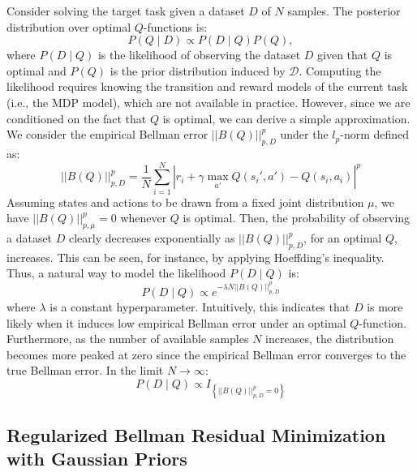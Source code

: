 \documentclass{article}
\begin{document}
Consider solving the target task given a dataset $D$ of $N$ samples. The posterior distribution over optimal $Q$-functions is:
\begin{equation}
P(Q \mid D) \propto P(D \mid Q)P(Q),
\end{equation}
where $P(D \mid Q)$ is the likelihood of observing the dataset $D$ given that $Q$ is optimal and $P(Q)$ is the prior distribution induced by $\mathcal{D}$. Computing the likelihood requires knowing the transition and reward models of the current task (i.e., the MDP model), which are not available in practice. However, since we are conditioned on the fact that $Q$ is optimal, we can derive a simple approximation. We consider the empirical Bellman error $||B(Q)||_{p,D}^p$ under the $l_p$-norm defined as:
\begin{equation}
||B(Q)||_{p,D}^p = \frac{1}{N}\sum_{i=1}^N \left\lvert r_i + \gamma\max_{a'}Q(s_i',a') - Q(s_i,a_i) \right\rvert^p
\end{equation}
Assuming states and actions to be drawn from a fixed joint distribution $\mu$, we have $||B(Q)||_{p,\mu}^p = 0$ whenever $Q$ is optimal. Then, the probability of observing a dataset $D$ clearly decreases exponentially as $||B(Q)||_{p,D}^p$, for  an optimal $Q$, increases. This can be seen, for instance, by applying Hoeffding's inequality. Thus, a natural way to model the likelihood $P(D \mid Q)$ is:
\begin{equation}
P(D \mid Q) \propto e^{-\lambda N ||B(Q)||_{p,D}^p}
\end{equation}
where $\lambda$ is a constant hyperparameter. Intuitively, this indicates that $D$ is more likely when it induces low empirical Bellman error under an optimal $Q$-function. Furthermore, as the number of available samples $N$ increases, the distribution becomes more peaked at zero since the empirical Bellman error converges to the true Bellman error. In the limit $N \rightarrow \infty$:
\begin{equation}
P(D \mid Q) \propto I_{\left\{ ||B(Q)||_{p,D}^p = 0 \right\}}
\end{equation}

\subsection{Regularized Bellman Residual Minimization with Gaussian Priors}
\end{document}
